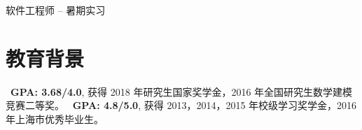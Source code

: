 \documentclass{resume}
\begin{document}
软件工程师 -- 暑期实习

\section{教育背景}
\ \textbf{GPA: 3.68/4.0}, 获得 2018 年研究生国家奖学金，2016 年全国研究生数学建模竞赛二等奖。
\ \textbf{GPA: 4.8/5.0}, 获得 2013，2014，2015 年校级学习奖学金，2016 年上海市优秀毕业生。
\end{document}
